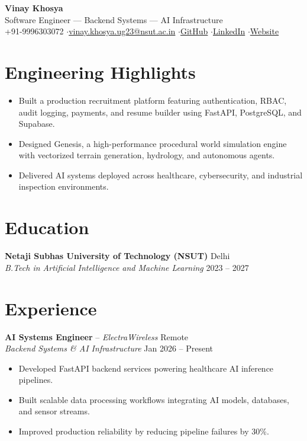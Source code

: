 \documentclass[10pt,a4paper]{article}
\begin{document}
\begin{center}
    {\LARGE \bfseries Vinay Khosya}\\[3pt]
    \small Software Engineer --- Backend Systems --- AI Infrastructure\\[3pt]
    +91-9996303072 \quad$\cdot$\quad \href{mailto:vinay.khosya.ug23@nsut.ac.in}{vinay.khosya.ug23@nsut.ac.in} \quad$\cdot$\quad \href{https://github.com/vinaykhosya}{GitHub} \quad$\cdot$\quad \href{https://linkedin.com/in/vinaykhosya}{LinkedIn} \quad$\cdot$\quad \href{https://vinaykhosya.com}{Website}
\end{center}

\section{Engineering Highlights}
\begin{itemize}
    \item Built a production recruitment platform featuring authentication, RBAC, audit logging, payments, and resume builder using FastAPI, PostgreSQL, and Supabase.
    \item Designed Genesis, a high-performance procedural world simulation engine with vectorized terrain generation, hydrology, and autonomous agents.
    \item Delivered AI systems deployed across healthcare, cybersecurity, and industrial inspection environments.
\end{itemize}

\section{Education}
\textbf{Netaji Subhas University of Technology (NSUT)} \hfill Delhi\\
\textit{B.Tech in Artificial Intelligence and Machine Learning} \hfill 2023 -- 2027

\section{Experience}

\textbf{AI Systems Engineer} -- \textit{ElectraWireless} \hfill Remote\\
\textit{Backend Systems \& AI Infrastructure} \hfill Jan 2026 -- Present
\begin{itemize}
    \item Developed FastAPI backend services powering healthcare AI inference pipelines.
    \item Built scalable data processing workflows integrating AI models, databases, and sensor streams.
    \item Improved production reliability by reducing pipeline failures by 30\%.
\end{itemize}
\end{document}

